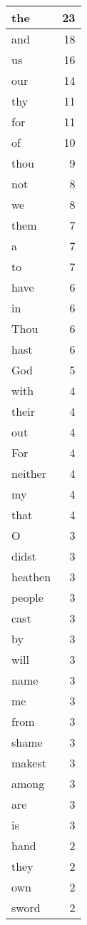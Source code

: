 \begin{center}
\begin{longtable}{l|r}
\hline \hline
\endlastfoot
the & 23 \\ \hline
and & 18 \\ \hline
us & 16 \\ \hline
our & 14 \\ \hline
thy & 11 \\ \hline
for & 11 \\ \hline
of & 10 \\ \hline
thou & 9 \\ \hline
not & 8 \\ \hline
we & 8 \\ \hline
them & 7 \\ \hline
a & 7 \\ \hline
to & 7 \\ \hline
have & 6 \\ \hline
in & 6 \\ \hline
Thou & 6 \\ \hline
hast & 6 \\ \hline
God & 5 \\ \hline
with & 4 \\ \hline
their & 4 \\ \hline
out & 4 \\ \hline
For & 4 \\ \hline
neither & 4 \\ \hline
my & 4 \\ \hline
that & 4 \\ \hline
O & 3 \\ \hline
didst & 3 \\ \hline
heathen & 3 \\ \hline
people & 3 \\ \hline
cast & 3 \\ \hline
by & 3 \\ \hline
will & 3 \\ \hline
name & 3 \\ \hline
me & 3 \\ \hline
from & 3 \\ \hline
shame & 3 \\ \hline
makest & 3 \\ \hline
among & 3 \\ \hline
are & 3 \\ \hline
is & 3 \\ \hline
hand & 2 \\ \hline
they & 2 \\ \hline
own & 2 \\ \hline
sword & 2 \\ \hline

\end{longtable}
\end{center}
